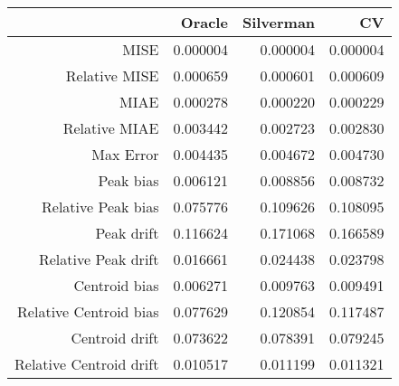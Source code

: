 \begin{tabular}{rrrr}
  \hline
 & Oracle & Silverman & CV \\ 
  \hline
MISE & 0.000004 & 0.000004 & 0.000004 \\ 
  Relative MISE & 0.000659 & 0.000601 & 0.000609 \\ 
  MIAE & 0.000278 & 0.000220 & 0.000229 \\ 
  Relative MIAE & 0.003442 & 0.002723 & 0.002830 \\ 
  Max Error & 0.004435 & 0.004672 & 0.004730 \\ 
  Peak bias & 0.006121 & 0.008856 & 0.008732 \\ 
  Relative Peak bias & 0.075776 & 0.109626 & 0.108095 \\ 
  Peak drift & 0.116624 & 0.171068 & 0.166589 \\ 
  Relative Peak drift & 0.016661 & 0.024438 & 0.023798 \\ 
  Centroid bias & 0.006271 & 0.009763 & 0.009491 \\ 
  Relative Centroid bias & 0.077629 & 0.120854 & 0.117487 \\ 
  Centroid drift & 0.073622 & 0.078391 & 0.079245 \\ 
  Relative Centroid drift & 0.010517 & 0.011199 & 0.011321 \\ 
   \hline
\end{tabular}
